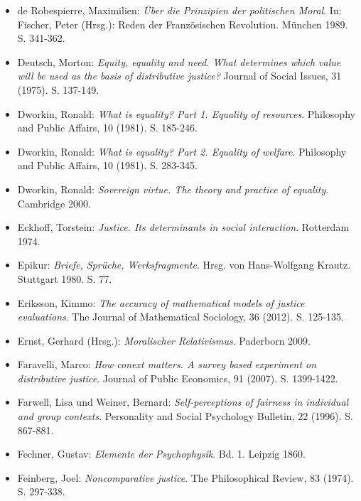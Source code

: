 \documentclass[a4paper]{thesis}
\begin{document}
\begin{itemize}[leftmargin=1.5em,label={},itemindent=-1.5em, itemsep=-1ex]
\item de Robespierre, Maximilien: \textit{Über die Prinzipien der politischen Moral}. In: Fischer, Peter (Hrsg.): Reden der Französischen Revolution. München 1989. S. 341-362.

\item Deutsch, Morton: \textit{Equity, equality and need. What determines which value will be used as the basis of distributive justice?} Journal of Social Issues, 31 (1975). S. 137-149.

\item Dworkin, Ronald: \textit{What is equality? Part 1. Equality of resources}. Philosophy and Public Affairs, 10 (1981). S. 185-246.

\item Dworkin, Ronald: \textit{What is equality? Part 2. Equality of welfare}. Philosophy and Public Affairs, 10 (1981). S. 283-345.

\item Dworkin, Ronald: \textit{Sovereign virtue. The theory and practice of equality}. Cambridge 2000.

\item Eckhoff, Torstein: \textit{Justice. Its determinants in social interaction}. Rotterdam 1974.

\item Epikur: \textit{Briefe, Sprüche, Werksfragmente}. Hrsg. von Hans-Wolfgang Krautz. Stuttgart 1980. S. 77.

\item Eriksson, Kimmo: \textit{The accuracy of mathematical models of justice evaluations}. The Journal of Mathematical Sociology, 36 (2012). S. 125-135.

\item Ernst, Gerhard (Hrsg.): \textit{Moralischer Relativismus}. Paderborn 2009.

\item Faravelli, Marco: \textit{How conext matters. A survey based experiment on distributive justice}. Journal of Public Economics, 91 (2007). S. 1399-1422.

\item Farwell, Lisa und Weiner, Bernard: \textit{Self-perceptions of fairness in individual and group contexts}. Personality and Social Psychology Bulletin, 22 (1996). S. 867-881.

\item Fechner, Gustav: \textit{Elemente der Psychophysik}. Bd. 1. Leipzig 1860.

\item Feinberg, Joel: \textit{Noncomparative justice}. The Philosophical Review, 83 (1974). S. 297-338.


\end{itemize}
\end{document}
